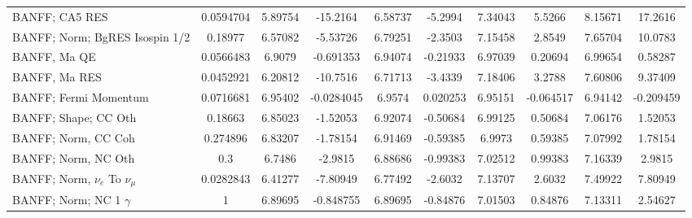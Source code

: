 \begin{tabular}{| l | S | S  S | S  S | S  S | S  S | }
                                                                  BANFF; CA5 RES &       0.0594704 &         5.89754 &        -15.2164 &         6.58737 &         -5.2994 &         7.34043 &          5.5266 &         8.15671 &         17.2616 \\ 
                                                  BANFF; Norm; BgRES Isospin 1/2 &         0.18977 &         6.57082 &        -5.53726 &         6.79251 &         -2.3503 &         7.15458 &          2.8549 &         7.65704 &         10.0783 \\ 
                                                                    BANFF, Ma QE &       0.0566483 &          6.9079 &       -0.691353 &         6.94074 &        -0.21933 &         6.97039 &         0.20694 &         6.99654 &         0.58287 \\ 
                                                                   BANFF, Ma RES &       0.0452921 &         6.20812 &        -10.7516 &         6.71713 &         -3.4339 &         7.18406 &          3.2788 &         7.60806 &         9.37409 \\ 
                                                           BANFF; Fermi Momentum &       0.0716681 &         6.95402 &      -0.0284045 &          6.9574 &        0.020253 &         6.95151 &       -0.064517 &         6.94142 &       -0.209459 \\ 
                                                            BANFF; Shape; CC Oth &         0.18663 &         6.85023 &        -1.52053 &         6.92074 &        -0.50684 &         6.99125 &         0.50684 &         7.06176 &         1.52053 \\ 
                                                             BANFF; Norm, CC Coh &        0.274896 &         6.83207 &        -1.78154 &         6.91469 &        -0.59385 &          6.9973 &         0.59385 &         7.07992 &         1.78154 \\ 
                                                             BANFF; Norm, NC Oth &             0.3 &          6.7486 &         -2.9815 &         6.88686 &        -0.99383 &         7.02512 &         0.99383 &         7.16339 &          2.9815 \\ 
                                           BANFF; Norm, $\nu_{e}$ To $\nu_{\mu}$ &       0.0282843 &         6.41277 &        -7.80949 &         6.77492 &         -2.6032 &         7.13707 &          2.6032 &         7.49922 &         7.80949 \\ 
                                                      BANFF; Norm; NC 1 $\gamma$ &               1 &         6.89695 &       -0.848755 &         6.89695 &        -0.84876 &         7.01503 &         0.84876 &         7.13311 &         2.54627 \\ 

\end{tabular}
